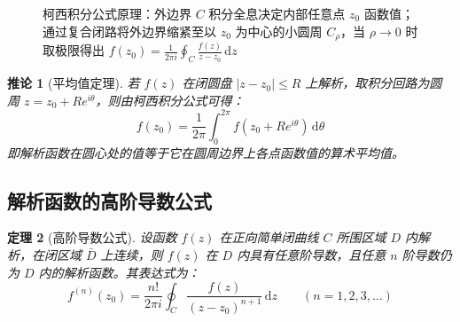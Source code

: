 \documentclass[11pt,a4paper,fontset=fandol]{ctexart}
\newtheorem{theorem}{定理}[section]
\newtheorem{corollary}[theorem]{推论}
\theoremstyle{remark}
\begin{document}
\begin{figure}[htbp]
\centering
{}
\caption{柯西积分公式原理：外边界 $C$ 积分全息决定内部任意点 $z_0$ 函数值；通过复合闭路将外边界缩紧至以 $z_0$ 为中心的小圆周 $C_\rho$，当 $\rho \to 0$ 时取极限得出 $f(z_0) = \frac{1}{2\pi i}\oint_C \frac{f(z)}{z - z_0}\,\mathrm{d}z$}
\label{fig:cauchy_integral_formula}
\end{figure}

\begin{corollary}[平均值定理]
若 $f(z)$ 在闭圆盘 $|z - z_0| \le R$ 上解析，取积分回路为圆周 $z = z_0 + R e^{i\theta}$，则由柯西积分公式可得：
\begin{equation}
    f(z_0) = \frac{1}{2\pi} \int_0^{2\pi} f(z_0 + R e^{i\theta})\,\mathrm{d}\theta
\end{equation}
即解析函数在圆心处的值等于它在圆周边界上各点函数值的算术平均值。
\end{corollary}

\subsection{解析函数的高阶导数公式}

\begin{theorem}[高阶导数公式]
设函数 $f(z)$ 在正向简单闭曲线 $C$ 所围区域 $D$ 内解析，在闭区域 $\bar{D}$ 上连续，则 $f(z)$ 在 $D$ 内具有任意阶导数，且任意 $n$ 阶导数仍为 $D$ 内的解析函数。其表达式为：
\begin{equation}
    f^{(n)}(z_0) = \frac{n!}{2\pi i} \oint_C \frac{f(z)}{(z - z_0)^{n+1}}\,\mathrm{d}z \qquad (n = 1, 2, 3, \dots)
\end{equation}
\end{theorem}
\end{document}
